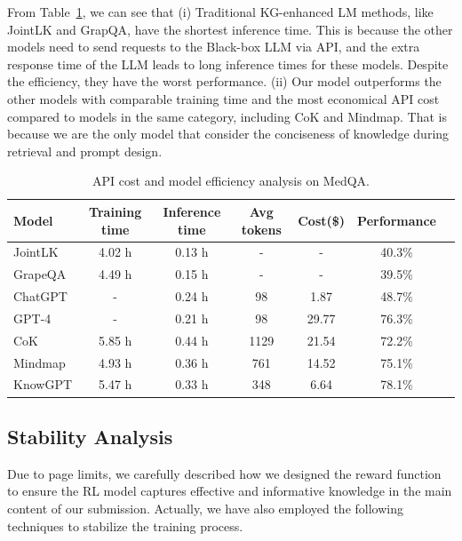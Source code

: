 \documentclass{article}
\theoremstyle{boldremark}
\begin{document}
From Table~\ref{tab:effi_analysis}, we can see that (i) Traditional KG-enhanced LM methods, like JointLK and GrapQA,  have the shortest inference time. This is because the other models need to send requests to the Black-box LLM via API, and the extra response time of the LLM leads to long inference times for these models. Despite the efficiency, they have the worst performance. (ii) Our model outperforms the other models with comparable training time and the most economical API cost compared to models in the same category, including CoK and Mindmap. That is because we are the only model that consider the conciseness of knowledge during retrieval and prompt design.
\begin{table}[thp]
\centering
 \vspace{-3mm}
    \caption{API cost and model efficiency analysis on MedQA.}  
    \label{tab:effi_analysis} 
    \setlength\tabcolsep{5pt} %
    \begin{tabular}{l c c c c cc}  
    \toprule  
     Model & Training time & Inference time&Avg tokens&Cost(\$)&Performance\\ \midrule
JointLK     &4.02 h& 0.13 h& -& -& 40.3\%\\
GrapeQA &4.49 h &0.15 h &- &- &39.5\%\\
ChatGPT &- &0.24 h& 98& 1.87 &48.7\%\\
GPT-4 &- &0.21 h& 98 &29.77& 76.3\%\\
CoK &5.85 h &0.44 h& 1129& 21.54& 72.2\% \\
Mindmap& 4.93 h &0.36 h& 761 &14.52 &75.1\%\\ \midrule
KnowGPT &5.47 h& 0.33 h &348 &6.64 &78.1\%\\
    
   
    \bottomrule  
    \end{tabular}
     \vspace{-5mm}
\end{table}  

\subsection{Stability Analysis}
Due to page limits, we carefully described how we designed the reward function to ensure the RL model captures effective and informative knowledge in the main content of our submission. Actually, we have also employed the following techniques to stabilize the training process.
\end{document}
